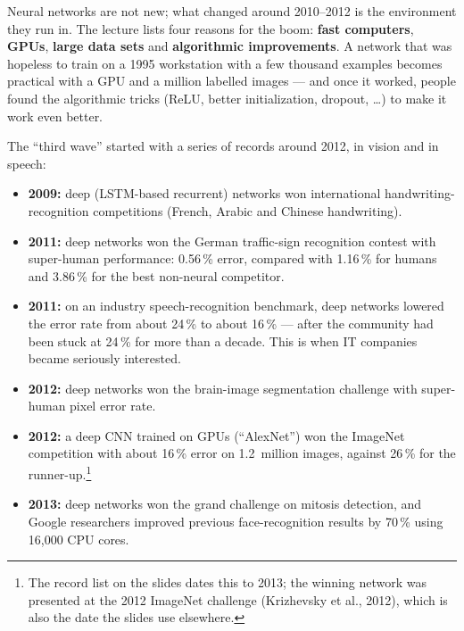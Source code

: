 \documentclass[11pt, oneside]{book}
\begin{document}
\begin{intbox}
Neural networks are not new; what changed around 2010--2012 is the
environment they run in. The lecture lists four reasons for the boom:
\textbf{fast computers}, \textbf{GPUs}, \textbf{large data sets} and
\textbf{algorithmic improvements}. A network that was hopeless to train on
a 1995 workstation with a few thousand examples becomes practical with
a GPU and a million labelled images --- and once it worked, people found
the algorithmic tricks (ReLU, better initialization, dropout, \ldots) to make
it work even better.
\end{intbox}

The ``third wave'' started with a series of records around 2012, in vision
and in speech:
\begin{itemize}
  \item \textbf{2009:} deep (LSTM-based recurrent) networks won
    international handwriting-recognition competitions (French, Arabic and
    Chinese handwriting).
  \item \textbf{2011:} deep networks won the German traffic-sign recognition
    contest with super-human performance: 0.56\,\% error, compared with
    1.16\,\% for humans and 3.86\,\% for the best non-neural competitor.
  \item \textbf{2011:} on an industry speech-recognition benchmark, deep
    networks lowered the error rate from about 24\,\% to about 16\,\% --- after
    the community had been stuck at 24\,\% for more than a decade. This is
    when IT companies became seriously interested.
  \item \textbf{2012:} deep networks won the brain-image segmentation
    challenge with super-human pixel error rate.
  \item \textbf{2012:} a deep CNN trained on GPUs (``AlexNet'') won the
    ImageNet competition with about 16\,\% error on 1.2~million images,
    against 26\,\% for the runner-up.\footnote{The record list on the slides
    dates this to 2013; the winning network was presented at the 2012
    ImageNet challenge (Krizhevsky et al., 2012), which is also the date the
    slides use elsewhere.}
  \item \textbf{2013:} deep networks won the grand challenge on mitosis
    detection, and Google researchers improved previous face-recognition
    results by 70\,\% using 16{,}000 CPU cores.
\end{itemize}
\end{document}
